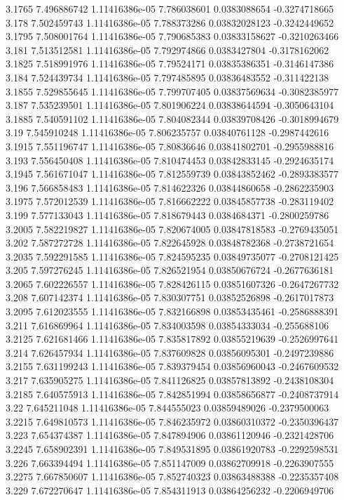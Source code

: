 {3.1765 7.496886742 1.11416386e-05 7.786038601 0.0383088654 -0.3274718665
3.178 7.502459743 1.11416386e-05 7.788373286 0.03832028123 -0.3242449652
3.1795 7.508001764 1.11416386e-05 7.790685383 0.03833158627 -0.3210263466
3.181 7.513512581 1.11416386e-05 7.792974866 0.0383427804 -0.3178162062
3.1825 7.518991976 1.11416386e-05 7.79524171 0.03835386351 -0.3146147386
3.184 7.524439734 1.11416386e-05 7.797485895 0.03836483552 -0.311422138
3.1855 7.529855645 1.11416386e-05 7.799707405 0.03837569634 -0.3082385977
3.187 7.535239501 1.11416386e-05 7.801906224 0.03838644594 -0.3050643104
3.1885 7.540591102 1.11416386e-05 7.804082344 0.03839708426 -0.3018994679
3.19 7.545910248 1.11416386e-05 7.806235757 0.03840761128 -0.2987442616
3.1915 7.551196747 1.11416386e-05 7.80836646 0.03841802701 -0.2955988816
3.193 7.556450408 1.11416386e-05 7.810474453 0.03842833145 -0.2924635174
3.1945 7.561671047 1.11416386e-05 7.812559739 0.03843852462 -0.2893383577
3.196 7.566858483 1.11416386e-05 7.814622326 0.03844860658 -0.2862235903
3.1975 7.572012539 1.11416386e-05 7.816662222 0.03845857738 -0.283119402
3.199 7.577133043 1.11416386e-05 7.818679443 0.0384684371 -0.2800259786
3.2005 7.582219827 1.11416386e-05 7.820674005 0.03847818583 -0.2769435051
3.202 7.587272728 1.11416386e-05 7.822645928 0.03848782368 -0.2738721654
3.2035 7.592291585 1.11416386e-05 7.824595235 0.03849735077 -0.2708121425
3.205 7.597276245 1.11416386e-05 7.826521954 0.03850676724 -0.2677636181
3.2065 7.602226557 1.11416386e-05 7.828426115 0.03851607326 -0.2647267732
3.208 7.607142374 1.11416386e-05 7.830307751 0.03852526898 -0.2617017873
3.2095 7.612023555 1.11416386e-05 7.832166898 0.03853435461 -0.2586888391
3.211 7.616869964 1.11416386e-05 7.834003598 0.03854333034 -0.255688106
3.2125 7.621681466 1.11416386e-05 7.835817892 0.03855219639 -0.2526997641
3.214 7.626457934 1.11416386e-05 7.837609828 0.03856095301 -0.2497239886
3.2155 7.631199243 1.11416386e-05 7.839379454 0.03856960043 -0.2467609532
3.217 7.635905275 1.11416386e-05 7.841126825 0.03857813892 -0.2438108304
3.2185 7.640575913 1.11416386e-05 7.842851994 0.03858656877 -0.2408737914
3.22 7.645211048 1.11416386e-05 7.844555023 0.03859489026 -0.2379500063
3.2215 7.649810573 1.11416386e-05 7.846235972 0.03860310372 -0.2350396437
3.223 7.654374387 1.11416386e-05 7.847894906 0.03861120946 -0.2321428706
3.2245 7.658902391 1.11416386e-05 7.849531895 0.03861920783 -0.2292598531
3.226 7.663394494 1.11416386e-05 7.851147009 0.03862709918 -0.2263907555
3.2275 7.667850607 1.11416386e-05 7.852740323 0.03863488388 -0.2235357408
3.229 7.672270647 1.11416386e-05 7.854311913 0.03864256232 -0.2206949706
}

